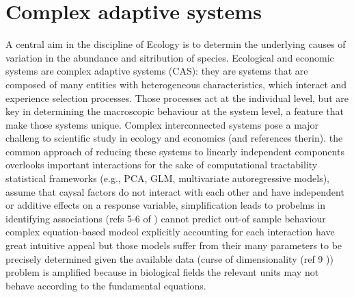 \section{Complex adaptive systems}
\label{sec:intro:cas}
\begin{outline}
    \1 A central aim in the discipline of Ecology is to determin the underlying causes of variation in the abundance and sitribution of species.
    \1 Ecological and economic systems are complex adaptive systems (CAS): they are systems that are composed of many entities with heterogeneous characteristics, which interact and experience selection processes. Those processes act at the individual level, but are key in determining the macroscopic behaviour at the system level, a feature that make those systems unique.
    \1 Complex interconnected systems pose a major challeng to scientific study in ecology and economics \cite{Ye2016} (and references therin).
        \2 the common approach of reducing these systems to linearly independent components overlooks important interactions for the sake of computational tractability 
        \2 statistical frameworks (e.g., PCA, GLM, multivariate autoregressive models), assume that caysal factors do not interact with each other and have independent or additive effects on a response variable,
            \3 simplification leads to probelms in identifying associations (refs 5-6 of \cite{Ye2016})
            \3 cannot predict out-of sample behaviour
        \2 complex equation-based modeol explicitly accounting for each interaction have great intuitive appeal 
            \3 but those models suffer from their many parameters to be precisely determined given the available data (curse of dimensionality (ref 9 \cite{Ye2016}))
            \3 problem is amplified because in biological fields the relevant units may not behave according to the fundamental equations.
\end{outline}
